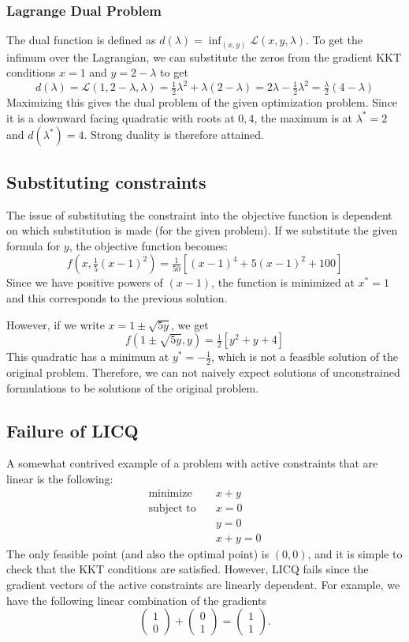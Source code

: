 \documentclass[11pt]{article}
\newcommand{\pvec}[1]{\begin{pmatrix}#1\end{pmatrix}}
\theoremstyle{problemstyle}
\begin{document}
\subsubsection*{Lagrange Dual Problem}
The dual function is defined as $d(\lambda) = \inf_{(x,y)}
\mathcal{L}(x,y,\lambda)$. To get the infimum over the Lagrangian, we can
substitute the zeros from the gradient KKT conditions $x = 1$ and $y = 2 -
\lambda$ to get
\[
  d(\lambda) = \mathcal{L}(1,2-\lambda,\lambda) = \tfrac{1}{2}\lambda^2 +
  \lambda(2 - \lambda) = 2\lambda - \tfrac{1}{2}\lambda^2 = \tfrac{\lambda}{2}(4
  - \lambda)
\]
Maximizing this gives the dual problem of the given optimization problem. Since
it is a downward facing quadratic with roots at $0, 4$, the maximum is at
$\lambda^* = 2$ and $d(\lambda^*) = 4$. Strong duality is therefore attained.

\subsection*{Substituting constraints}
The issue of substituting the constraint into the objective function is
dependent on which substitution is made (for the given problem). If we
substitute the given formula for $y$, the objective function becomes:
\[
  f(x, \tfrac{1}{5}(x-1)^2) = \tfrac{1}{50}\left[(x-1)^4 + 5(x-1)^2 + 100\right]
\]
Since we have positive powers of $(x-1)$, the function is minimized at $x^* = 1$
and this corresponds to the previous solution.

However, if we write $x = 1 \pm \sqrt{5y}$, we get
\[
  f(1 \pm \sqrt{5y}, y) = \tfrac{1}{2}\left[y^2 + y + 4\right]
\]
This quadratic has a minimum at $y^* = -\tfrac{1}{2}$, which is not a feasible
solution of the original problem. Therefore, we can not naively expect solutions
of unconstrained formulations to be solutions of the original problem.
\subsection*{Failure of LICQ}
A somewhat contrived example of a problem with active constraints that are
linear is the following:
\[
\begin{alignedat}{2}
\text{minimize}  \quad & x+y   \\
\text{subject to}\quad & x = 0 \\
                       & y = 0 \\
                       & x + y = 0
\end{alignedat}
\]
The only feasible point (and also the optimal point) is $(0,0)$, and it is
simple to check that the KKT conditions are satisfied. However, LICQ fails since
the gradient vectors of the active constraints are linearly dependent. For
example, we have the following linear combination of the gradients
\[
  \pvec{1\\0} + \pvec{0\\1} = \pvec{1\\1}.
\]
\end{document}
